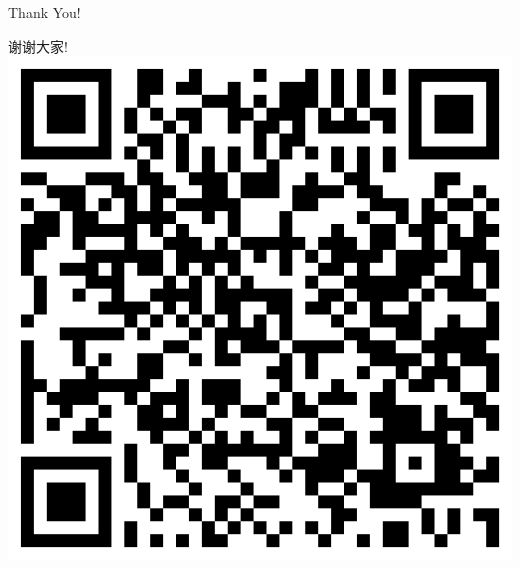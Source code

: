 \documentclass[10pt]{beamer}
\begin{document}










\begin{frame}
  \begin{center}
    \Large Thank You!

    \Large 谢谢大家!
\vfill
\includegraphics[width=0.4\linewidth]{presentation.png}
\end{center}
\end{frame}
\end{document}
